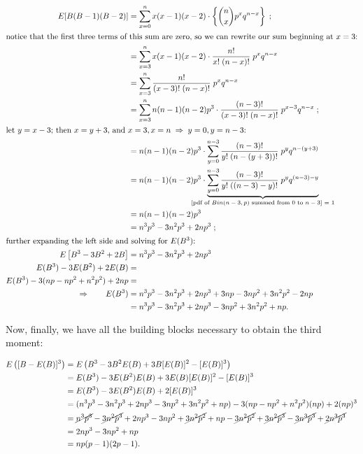 \documentclass{article}
\begin{document}
\begin{align*}
  E[B(B-1)(B-2)] &= \sum_{x=0}^n x (x-1) (x-2) \cdot \left\{ \binom{n}{x} p^x q^{n-x} \right\} \;; \\
  \intertext{notice that the first three terms of this sum are zero, so we can rewrite our sum beginning at $x = 3$:}
  &= \sum_{x=3}^n x(x-1)(x-2) \cdot \frac{n!}{x!\;(n-x)!} \; p^x q^{n-x} \\
  &= \sum_{x=3}^n \frac{n!}{(x-3)!\;(n-x)!} \; p^x q^{n-x} \\
  &= \sum_{x=3}^n n(n-1)(n-2) p^3 \cdot \frac{(n-3)!}{(x-3)!\;(n-x)!} \; p^{x-3}q^{n-x} \;; \\
  \intertext{let $y=x-3$; then $x=y+3$, and $x=3, x=n \Ra y=0, y=n-3$:}
  &= n(n-1)(n-2)p^3 \cdot \sum_{y=0}^{n-3} \frac{(n-3)!}{y!\;(n-(y+3))!} \; p^y q^{n-(y+3)} \\
  &= n(n-1)(n-2)p^3 \cdot \underbrace {\sum_{y=0}^{n-3} \frac{(n-3)!}{y!\;((n-3)-y)!} \; p^y q^{(n-3)-y}}_{\mathclap{\textnormal{[pdf of $Bin(n-3,p)$ summed from 0 to $n-3$] = 1}}} \\
  &= n(n-1)(n-2)p^3 \\
  &= n^3p^3 - 3n^2p^3 + 2np^3 \;; \\
  \intertext{further expanding the left side and solving for $E(B^3)$:}
  E \left[ B^3 - 3B^2 + 2B \right] &= n^3p^3 - 3n^2p^3 + 2np^3 \\
  E(B^3) - 3E(B^2) + 2E(B) &= \\
  E(B^3) - 3(np - np^2 + n^2p^2) + 2np &= \\
  \Rightarrow \qquad E(B^3) &= n^3p^3 - 3n^2p^3 + 2np^3 + 3np - 3np^2 + 3n^2p^2 - 2np \\
  &= n^3p^3 - 3n^2p^3 + 2np^3 - 3np^2 + 3n^2p^2 + np.
\end{align*}

Now, finally, we have all the building blocks necessary to obtain the third
moment:

\begin{align*}
  E \left( [B - E(B)]^3 \right) &= E \left( B^3 - 3B^2 E(B) + 3B [E(B)]^2 - [E(B)]^3 \right) \\
  &= E(B^3) - 3 E(B^2) E(B) + 3 E(B) [E(B)]^2 - [E(B)]^3 \\
  &= E(B^3) - 3 E(B^2) E(B) + 2 [E(B)]^3 \\
  &= (n^3p^3 - 3n^2p^3 + 2np^3 - 3np^2 + 3n^2p^2 + np) - 3(np - np^2 + n^2p^2)(np) + 2(np)^3 \\
  &= \cancel{n^3p^3} - \cancel{3n^2p^3} + 2np^3 - 3np^2 + \cancel{3n^2p^2} + np - \cancel{3n^2p^2} + \cancel{3n^2p^3} - \cancel{3n^3p^3} + \cancel{2n^3p^3} \\
  &= 2np^3 - 3np^2 + np \\
  &= np(p-1)(2p-1).
\end{align*}
\end{document}
